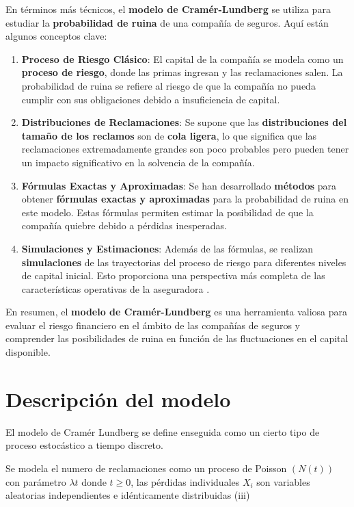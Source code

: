 \documentclass[
  us-letterpaper,
]{scrreprt}
\theoremstyle{definition}
\theoremstyle{plain}
\theoremstyle{plain}
\theoremstyle{remark}
\begin{document}
En términos más técnicos, el \textbf{modelo de Cramér-Lundberg} se
utiliza para estudiar la \textbf{probabilidad de ruina} de una compañía
de seguros. Aquí están algunos conceptos clave:

\begin{enumerate}
\def\labelenumi{\arabic{enumi}.}
\item
  \textbf{Proceso de Riesgo Clásico}: El capital de la compañía se
  modela como un \textbf{proceso de riesgo}, donde las primas ingresan y
  las reclamaciones salen. La probabilidad de ruina se refiere al riesgo
  de que la compañía no pueda cumplir con sus obligaciones debido a
  insuficiencia de capital.
\item
  \textbf{Distribuciones de Reclamaciones}: Se supone que las
  \textbf{distribuciones del tamaño de los reclamos} son de \textbf{cola
  ligera}, lo que significa que las reclamaciones extremadamente grandes
  son poco probables pero pueden tener un impacto significativo en la
  solvencia de la compañía.
\item
  \textbf{Fórmulas Exactas y Aproximadas}: Se han desarrollado
  \textbf{métodos} para obtener \textbf{fórmulas exactas y aproximadas}
  para la probabilidad de ruina en este modelo. Estas fórmulas permiten
  estimar la posibilidad de que la compañía quiebre debido a pérdidas
  inesperadas.
\item
  \textbf{Simulaciones y Estimaciones}: Además de las fórmulas, se
  realizan \textbf{simulaciones} de las trayectorias del proceso de
  riesgo para diferentes niveles de capital inicial. Esto proporciona
  una perspectiva más completa de las características operativas de la
  aseguradora .
\end{enumerate}

En resumen, el \textbf{modelo de Cramér-Lundberg} es una herramienta
valiosa para evaluar el riesgo financiero en el ámbito de las compañías
de seguros y comprender las posibilidades de ruina en función de las
fluctuaciones en el capital disponible.

\section{Descripción del modelo}\label{descripciuxf3n-del-modelo}

El modelo de Cramér Lundberg se define enseguida como un cierto tipo de
proceso estocástico a tiempo discreto.

Se modela el numero de reclamaciones como un proceso de Poisson
\((N(t))\) con parámetro \(\lambda t\) donde \(t\geq 0\), las pérdidas
individuales \(X_i\) son variables aleatorias independientes e
idénticamente distribuidas (iii)
\end{document}

